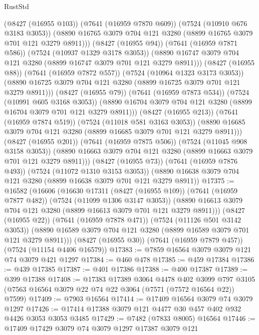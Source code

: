 \begin{lexlean}{RustStd}
\begin{coremodule}
{\begin{coremodule}
{{{{{{{{{{{{{{{{{{{{{{{{{{{{{{{{                (@8427 (@16955 @103))
                (@7641 (@16959 @7870 @609))
                (@7524 (@10910 @676 @3183 @3053))
                (@8890 @16765 @3079 @704 @121 @3280 (@8899 @16765 @3079 @701 @121 @3279 @8911)))
              (@8427 (@16955 @94))
              (@7641 (@16959 @7871 @586))
              (@7524 (@10937 @1329 @3178 @3053))
              (@8890 @16747 @3079 @704 @121 @3280 (@8899 @16747 @3079 @701 @121 @3279 @8911)))
            (@8427 (@16955 @88))
            (@7641 (@16959 @7872 @557))
            (@7524 (@10964 @1323 @3173 @3053))
            (@8890 @16725 @3079 @704 @121 @3280 (@8899 @16725 @3079 @701 @121 @3279 @8911)))
          (@8427 (@16955 @79))
          (@7641 (@16959 @7873 @534))
          (@7524 (@10991 @605 @3168 @3053))
          (@8890 @16704 @3079 @704 @121 @3280 (@8899 @16704 @3079 @701 @121 @3279 @8911)))
        (@8427 (@16955 @213))
        (@7641 (@16959 @7874 @519))
        (@7524 (@11018 @581 @3163 @3053))
        (@8890 @16685 @3079 @704 @121 @3280 (@8899 @16685 @3079 @701 @121 @3279 @8911)))
      (@8427 (@16955 @201))
      (@7641 (@16959 @7875 @506))
      (@7524 (@11045 @908 @3158 @3053))
      (@8890 @16663 @3079 @704 @121 @3280 (@8899 @16663 @3079 @701 @121 @3279 @8911)))
    (@8427 (@16955 @73))
    (@7641 (@16959 @7876 @493))
    (@7524 (@11072 @1310 @3153 @3053))
    (@8890 @16638 @3079 @704 @121 @3280 (@8899 @16638 @3079 @701 @121 @3279 @8911))
@17375 := @16582
    (@16606
      (@16630
        @17311
        (@8427 (@16955 @109))
        (@7641 (@16959 @7877 @482))
        (@7524 (@11099 @1306 @3147 @3053))
        (@8890 @16613 @3079 @704 @121 @3280 (@8899 @16613 @3079 @701 @121 @3279 @8911)))
      (@8427 (@16955 @22))
      (@7641 (@16959 @7878 @471))
      (@7524 (@11126 @501 @3142 @3053))
      (@8890 @16589 @3079 @704 @121 @3280 (@8899 @16589 @3079 @701 @121 @3279 @8911)))
    (@8427 (@16955 @30))
    (@7641 (@16959 @7879 @457))
    (@7524 (@11154 @4406 @16579))
@17383 := @7859 @16564 @3079 @3079 @121 @74 @3079 @421 @1297
@17384 := @460 @478
@17385 := @459 @17384
@17386 := @439 @17385
@17387 := @401 @17386
@17388 := @400 @17387
@17389 := @399 @17388
@17408 := @17383
    @17389
    @3064
    @4478
    @402
    @3099
    @797
    @3105
    (@7563 @16564 @3079 @22 @74 @22 @3064 (@7571 (@7572 @16564 @22)) @7599)
@17409 := @7903 @16564
@17414 := @17409 @16564 @3079 @74 @3079 @1297
@17426 := @17414 @17388 @3079 @121 @4477 @30 @457 @402 @932 @4426 @3053 @3053 @3485
@17429 := @7482 (@7833 @8005) @16564
@17446 := @17409
    @17429
    @3079
    @74
    @3079
    @1297
    @17387
    @3079
    @121
}}}}}}}}}}}}}}}}}}}}}}}}}}}}}}}}
\end{coremodule}}
\end{coremodule}
\end{lexlean}
